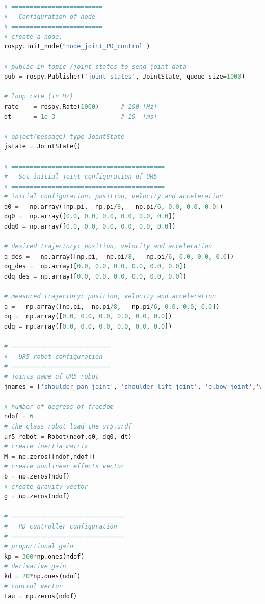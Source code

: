 \begin{lstlisting}[language=Python,caption={Rosnode to move the second and fifth joint of UR5 robot with the requirement motion of activity 1.3.}, label={lst:joint_PD_control}]
# =========================
#   Configuration of node
# =========================
# create a node: 
rospy.init_node("node_joint_PD_control")

# public in topic /joint_states	to send joint data	
pub = rospy.Publisher('joint_states', JointState, queue_size=1000)

# loop rate (in Hz)
rate 	= rospy.Rate(1000)		# 100 [Hz]
dt 		= 1e-3					# 10  [ms]

# object(message) type JointState
jstate = JointState()

# ==========================================
#   Set initial joint configuration of UR5
# ==========================================
# initial configuration: position, velocity and acceleration 
q0 =   np.array([np.pi, -np.pi/8,  -np.pi/6, 0.0, 0.0, 0.0])
dq0 =  np.array([0.0, 0.0, 0.0, 0.0, 0.0, 0.0]) 
ddq0 = np.array([0.0, 0.0, 0.0, 0.0, 0.0, 0.0]) 

# desired trajectory: position, velocity and acceleration
q_des =   np.array([np.pi, -np.pi/8,  -np.pi/6, 0.0, 0.0, 0.0]) 
dq_des =  np.array([0.0, 0.0, 0.0, 0.0, 0.0, 0.0]) 
ddq_des = np.array([0.0, 0.0, 0.0, 0.0, 0.0, 0.0]) 

# measured trajectory: position, velocity and acceleration
q =   np.array([np.pi, -np.pi/8,  -np.pi/6, 0.0, 0.0, 0.0])
dq =  np.array([0.0, 0.0, 0.0, 0.0, 0.0, 0.0]) 
ddq = np.array([0.0, 0.0, 0.0, 0.0, 0.0, 0.0]) 

# ===========================
#   UR5 robot configuration
# ===========================
# joints name of UR5 robot
jnames = ['shoulder_pan_joint', 'shoulder_lift_joint', 'elbow_joint','wrist_1_joint', 'wrist_2_joint', 'wrist_3_joint']

# number of degress of freedom
ndof = 6
# the class robot load the ur5.urdf
ur5_robot = Robot(ndof,q0, dq0, dt)
# create inertia matrix 
M = np.zeros([ndof,ndof])
# create nonlinear effects vector
b = np.zeros(ndof)
# create gravity vector
g = np.zeros(ndof)

# ===============================
#   PD controller configuration
# ===============================
# proportional gain
kp = 300*np.ones(ndof)
# derivative gain
kd = 20*np.ones(ndof)
# control vector
tau = np.zeros(ndof)    


\end{lstlisting}
